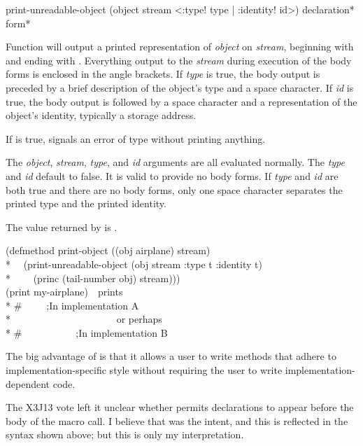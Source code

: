 \begin{defmac}
print-unreadable-object (object stream
                         <\!:type! type | \!:identity! id>)
                        {declaration}* {form}*

    Function will output a printed representation of \emph{object} on \emph{stream},
    beginning with
    \cd{\#<} and ending with \cdf{>}.  Everything output to the \emph{stream} during
    execution of the body
    forms is enclosed in the angle brackets.  If \emph{type} is true, the body
    output is preceded by a brief description of the object's type and a
    space character.  If \emph{id} is true, the body output is followed by
    a space character and a representation of the object's identity,
    typically a storage address.

    If  is true,  signals an error
    of type  without printing anything.

    The \emph{object}, \emph{stream}, \emph{type}, and \emph{id} arguments are all evaluated
    normally.  The \emph{type} and \emph{id} default to false.  It is valid to provide
    no body forms.  If \emph{type} and \emph{id} are both true and there are no
    body forms, only one space character separates the printed type and the printed identity.

    The value returned by  is .
\begin{lisp}
(defmethod print-object ((obj airplane) stream) \\*
~~(print-unreadable-object (obj stream :type t :identity t) \\*
~~~~(princ (tail-number obj) stream))) \\
(print my-airplane)~~\textrm{prints} \\*
\#<Airplane NW0773 777500123135>~~~~~;\textrm{In implementation A} \\*
~~~~~~~~~~~~~~~~~~~~~\textrm{or perhaps} \\*
\#<FAA:AIRPLANE NW0773 17>~~~~~~~~~~~;\textrm{In implementation B}
\end{lisp}
The big advantage of
 is that it allows a user to write  methods that
  adhere to implementation-specific style without requiring the user to write
  implementation-dependent code.

The X3J13 vote left it unclear whether 
permits declarations to appear before the body of the macro call.
I believe that was the intent, and this is reflected in the syntax shown above;
but this is only my interpretation.
\end{defmac}


